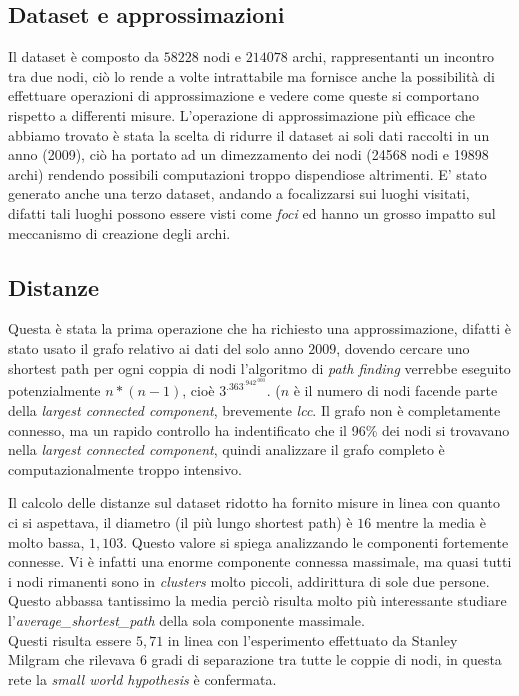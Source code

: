 \documentclass[a4paper]{article}
\newcommand{\lcc}{\textit{largest connected component}}
\begin{document}
\subsection{Dataset e approssimazioni}
Il dataset è composto da $58228$ nodi e $214078$ archi, rappresentanti un incontro tra due nodi, ciò lo rende a volte intrattabile ma fornisce anche la possibilità di effettuare operazioni di approssimazione e vedere come queste si comportano rispetto a differenti misure.
L'operazione di approssimazione più efficace che abbiamo trovato è stata la scelta di ridurre il dataset ai soli dati raccolti in un anno (2009), ciò ha portato ad un dimezzamento dei nodi (24568 nodi e 19898 archi) rendendo possibili computazioni troppo dispendiose altrimenti.
E' stato generato anche una terzo dataset, andando a focalizzarsi sui luoghi visitati, difatti tali luoghi possono essere visti come \textit{foci} ed hanno un grosso impatto sul meccanismo di creazione degli archi.

\subsection{Distanze}
Questa è stata la prima operazione che ha richiesto una approssimazione, difatti è stato usato il grafo relativo ai dati del solo anno $2009$, dovendo cercare uno shortest path per ogni coppia di nodi l'algoritmo di \textit{path finding} verrebbe eseguito potenzialmente $n*(n-1)$, cioè $3^.363^.942^.000$. ($n$ è il numero di nodi facende parte della \textit{largest connected component}, brevemente \textit{lcc}.
Il grafo non è completamente connesso, ma un rapido controllo ha indentificato che il 96\% dei nodi si trovavano nella \lcc, quindi analizzare il grafo completo è computazionalmente troppo intensivo.


Il calcolo delle distanze sul dataset ridotto ha fornito misure in linea con quanto ci si aspettava, il diametro (il più lungo shortest path) è $16$ mentre la media è molto bassa, $1,103$. Questo valore si spiega analizzando le componenti fortemente connesse.
Vi è infatti una enorme componente connessa massimale, ma quasi tutti i nodi rimanenti sono in \textit{clusters} molto piccoli, addirittura di sole due persone. Questo abbassa tantissimo la media perciò risulta molto più interessante studiare l'\textit{average\_shortest\_path} della sola componente massimale.\\
Questi risulta essere $5,71$ in linea con l'esperimento effettuato da Stanley Milgram che rilevava 6 gradi di separazione tra tutte le coppie di nodi, in questa rete la \textit{small world hypothesis} è confermata. 
\end{document}
